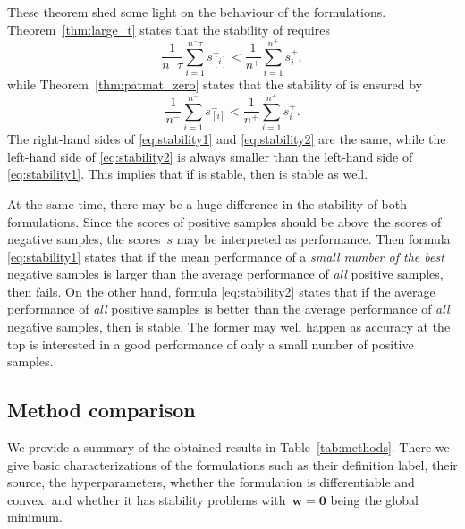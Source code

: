 These theorem shed some light on the behaviour of the formulations. Theorem~\ref{thm:large_t} states that the stability of \tauFPL requires
\begin{equation}\label{eq:stability1}
  \frac{1}{n^-\tau}\sum_{i=1}^{n^-\tau}s_{[i]}^- < \frac{1}{n^+}\sum_{i=1}^{n^+} s_{i}^+,
\end{equation}
while Theorem~\ref{thm:patmat_zero} states that the stability of \PatMatNP is ensured by
\begin{equation}\label{eq:stability2}
  \frac{1}{n^-}\sum_{i=1}^{n^-}s_{[i]}^- < \frac{1}{n^+}\sum_{i=1}^{n^+} s_{i}^+.
\end{equation}
The right-hand sides of \eqref{eq:stability1} and \eqref{eq:stability2} are the same, while the left-hand side of \eqref{eq:stability2} is always smaller than the left-hand side of \eqref{eq:stability1}. This implies that if \tauFPL is stable, then \PatMatNP is stable as well.

At the same time, there may be a huge difference in the stability of both formulations. Since the scores of positive samples should be above the scores of negative samples, the scores~$s$ may be interpreted as performance. Then formula \eqref{eq:stability1} states that if the mean performance of a \emph{small number of the best} negative samples is larger than the average performance of \emph{all} positive samples, then \tauFPL fails. On the other hand, formula \eqref{eq:stability2} states that if the average performance of \emph{all} positive samples is better than the average performance of \emph{all} negative samples, then \PatMatNP is stable. The former may well happen as accuracy at the top is interested in a good performance of only a small number of positive samples.

\subsection{Method comparison}

We provide a summary of the obtained results in Table~\ref{tab:methods}. There we give basic characterizations of the formulations such as their definition label, their source, the hyperparameters, whether the formulation is differentiable and convex, and whether it has stability problems with~$\bm{w}=\bm{0}$ being the global minimum. 

